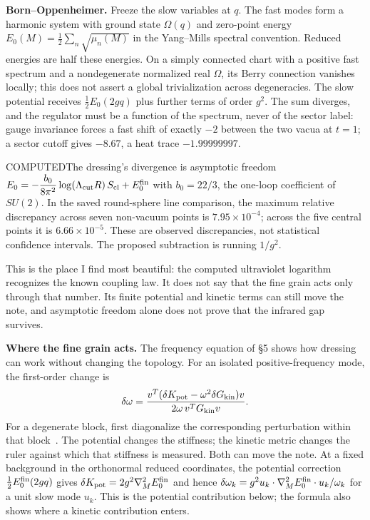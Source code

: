 \textbf{Born--Oppenheimer.} Freeze the slow variables at $q$. The fast modes form a harmonic system with ground state
$\Omega(q)$ and zero-point energy $E_0(M)=\tfrac12\sum_n\sqrt{\mu_n(M)}$ in the Yang--Mills spectral convention.
Reduced energies are half these energies. On a simply connected chart with a positive fast spectrum and a
nondegenerate normalized real $\Omega$, its Berry connection vanishes locally; this does not assert a global
trivialization across degeneracies. The slow potential receives $\tfrac12E_0(2gq)$ plus further terms of order $g^2$.
The sum diverges, and the regulator must be a function of the spectrum,
never of the sector label: gauge invariance forces a fast shift of exactly $-2$ between the two vacua at $t=1$; a
sector cutoff gives $-8.67$, a heat trace $-1.99999997$.

\begin{claim}{COMPUTED}{The dressing's divergence is asymptotic freedom}\label{b:b0}
$E_0=-\dfrac{b_0}{8\pi^2}\log(\Lambda_{\rm cut}R)\,S_{\rm cl}+E_0^{\rm fin}$ with $b_0=22/3$, the one-loop coefficient
of $SU(2)$. In the saved round-sphere line comparison, the maximum relative discrepancy across seven non-vacuum
points is $7.95\times10^{-4}$; across the five central points it is $6.66\times10^{-5}$.
These are observed discrepancies, not statistical confidence intervals. The proposed subtraction is running $1/g^2$.
\end{claim}

This is the place I find most beautiful: the computed ultraviolet logarithm recognizes the known coupling law.
It does not say that the fine grain acts only through that number. Its finite potential and kinetic terms can still
move the note, and asymptotic freedom alone does not prove that the infrared gap survives.

\textbf{Where the fine grain acts.} The frequency equation of \S5 shows how dressing can work without changing the
topology. For an isolated positive-frequency mode, the first-order change is
\begin{equation}\label{eq:dressing}
 \delta\omega=
 \frac{v^T(\delta K_{\rm pot}-\omega^2\delta G_{\rm kin})v}
      {2\omega\,v^TG_{\rm kin}v}.
\end{equation}
For a degenerate block, first diagonalize the corresponding perturbation within that block~\cite{Kato}.
The potential changes the stiffness; the kinetic metric changes the ruler against which that stiffness is measured.
Both can move the note. At a fixed background in the orthonormal reduced coordinates, the potential correction
$\tfrac12E_0^{\rm fin}(2gq)$ gives $\delta K_{\rm pot}=2g^2\nabla_M^2E_0^{\rm fin}$ and hence
$\delta\omega_k=g^2u_k\cdot\nabla_M^2E_0^{\rm fin}\cdot u_k/\omega_k$ for a unit slow mode $u_k$.
This is the potential contribution below; the formula also shows where a kinetic contribution enters.


